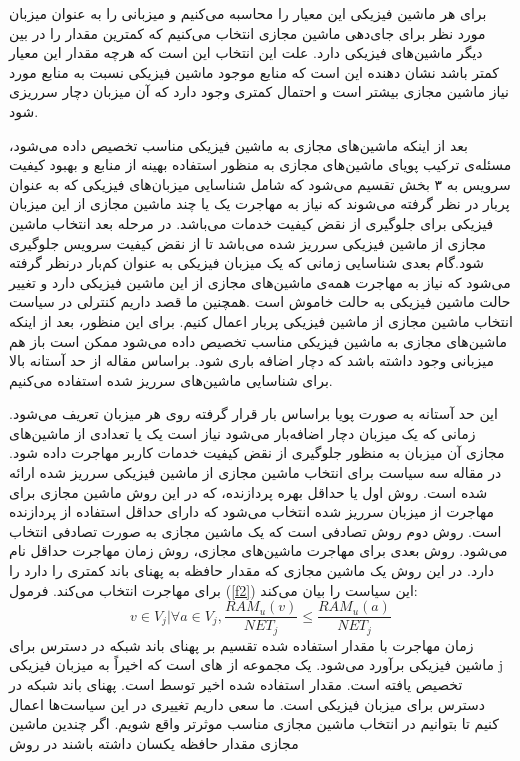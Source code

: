 برای هر ماشین فیزیکی این معیار را محاسبه می‌کنیم و میزبانی را به عنوان میزبان مورد نظر برای جای‌دهی ماشین مجازی انتخاب می‌کنیم که کمترین مقدار را در بین دیگر ماشین‌های فیزیکی دارد. علت این انتخاب این است که هرچه مقدار این معیار کمتر باشد نشان دهنده این است که منابع موجود ماشین فیزیکی نسبت به منابع مورد نیاز ماشین مجازی بیشتر است و احتمال کمتری وجود دارد که آن میزبان دچار سرریزی شود. 


بعد از اینکه ماشین‌های مجازی به ماشین فیزیکی مناسب تخصیص داده می‌شود، مسئله‌ی ترکیب پویای ماشین‌های مجازی به منظور استفاده بهینه از منابع و بهبود کیفیت سرویس به ۳ بخش تقسیم می‌شود که شامل شناسایی میزبان‌های فیزیکی که به عنوان پربار در نظر گرفته می‌شوند که نیاز به مهاجرت یک یا چند ماشین مجازی از این میزبان فیزیکی برای جلوگیری از نقض کیفیت خدمات می‌باشد. در مرحله بعد انتخاب ماشین مجازی از ماشین فیزیکی سرریز شده می‌باشد تا از نقض کیفیت سرویس جلوگیری شود.گام بعدی شناسایی زمانی که یک میزبان فیزیکی به عنوان کم‌بار
 در‌نظر گرفته می‌شود که نیاز به مهاجرت همه‌ی ماشین‌های مجازی از این ماشین فیزیکی دارد و تغییر حالت ماشین فیزیکی به حالت خاموش است
\cite{num9,num15}
.همچنین ما قصد داریم کنترلی در سیاست انتخاب ماشین مجازی از ماشین فیزیکی پربار اعمال کنیم. برای این منظور، بعد از اینکه ماشین‌های مجازی به ماشین فیزیکی مناسب تخصیص داده می‌شود ممکن است باز هم میزبانی وجود داشته باشد که دچار اضافه باری شود. براساس مقاله 
\cite{num9,num15}
 از حد آستانه بالا
  برای شناسایی ماشین‌های سرریز شده استفاده می‌کنیم. 

این حد آستانه به صورت پویا براساس بار قرار گرفته روی هر میزبان تعریف می‌شود. زمانی که یک میزبان دچار اضافه‌بار می‌شود نیاز است یک یا تعدادی از ماشین‌های مجازی آن میزبان به منظور جلوگیری از نقض کیفیت خدمات کاربر مهاجرت داده شود. در مقاله 
\cite{num15}
سه سیاست برای انتخاب ماشین مجازی از ماشین فیزیکی سرریز شده ارائه شده است. روش اول  
یا حداقل بهره پردازنده، که در این روش ماشین مجازی برای مهاجرت از میزبان سرریز شده انتخاب می‌شود که دارای حداقل استفاده از پردازنده است. روش دوم روش تصادفی است که یک ماشین مجازی به صورت تصادفی انتخاب می‌شود. روش بعدی برای مهاجرت ماشین‌های مجازی، روش زمان مهاجرت حداقل
نام دارد. در این روش یک ماشین مجازی که مقدار حافظه به پهنای باند کمتری را دارد را برای مهاجرت انتخاب می‌کند. فرمول
(\ref{f2})
 این سیاست را بیان می‌کند:
\cite{num15}
\begin{equation}
v\in V_j|\forall a \in V_j, \frac{RAM_u(v)}{NET_j} \leq \frac{RAM_u(a)}{NET_j}
\label{f2}
\end{equation}
زمان مهاجرت با مقدار
استفاده شده
تقسیم بر پهنای باند شبکه در دسترس برای ماشین فیزیکی
  برآورد می‌شود. یک مجموعه از
 ‌های است که اخیراً به میزبان فیزیکی j  تخصیص یافته است.  مقدار 
  استفاده شده اخیر توسط
   است.  پهنای باند شبکه در دسترس برای میزبان فیزیکی 
    است.
ما سعی داریم تغییری در این سیاست‌ها اعمال کنیم تا بتوانیم در انتخاب ماشین مجازی مناسب موثرتر واقع شویم. اگر چندین ماشین مجازی مقدار حافظه یکسان داشته باشند در روش 

